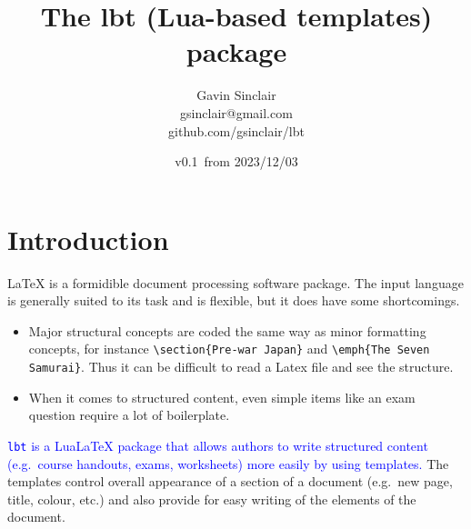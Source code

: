 \documentclass[11pt]{article}
\newcommand{\lbtpkg}{\texttt{lbt}}
\begin{document}
\title{The \textbf{lbt} (Lua-based templates) package}
\author{%
  Gavin Sinclair\\%
  gsinclair@gmail.com\\%
  github.com/gsinclair/lbt%
}
\date{v0.1~from 2023/12/03}

\maketitle

\vfill

\setcounter{secnumdepth}{5}
\setcounter{tocdepth}{5}
\tableofcontents

\vfill
\clearpage


\pagebreak


\section{Introduction}

\LaTeX{} is a formidible document processing software package. The input language is generally suited to its task and is flexible, but it does have some shortcomings.
\begin{itemize}
  \item Major structural concepts are coded the same way as minor formatting concepts, for instance \verb|\section{Pre-war Japan}| and \verb|\emph{The Seven Samurai}|. Thus it can be difficult to read a Latex file and see the structure.
  \item When it comes to structured content, even simple items like an exam question require a lot of boilerplate.
\end{itemize}

\textcolor{blue}{\lbtpkg{} is a Lua\LaTeX{} package that allows authors to write structured content (e.g.~course handouts, exams, worksheets) more easily by using templates.} The templates control overall appearance of a section of a document (e.g.~new page, title, colour, etc.) and also provide for easy writing of the elements of the document.
\end{document}
